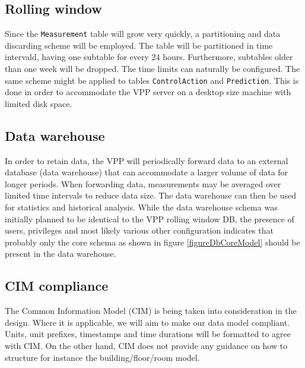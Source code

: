 \newpage


\subsection{Rolling window}\label{subsection:rollingwindow}
Since the \texttt{Measurement} table will grow very quickly, a partitioning and data discarding scheme will be employed. The table will be partitioned in time intervald, having one subtable for every 24 hours. Furthermore, subtables older than one week will be dropped. The time limits can naturally be configured. The same scheme might be applied to tables \texttt{ControlAction} and \texttt{Prediction}.
This is done in order to accommodate the VPP server on a desktop size machine with limited disk space.

\subsection{Data warehouse}
In order to retain data, the VPP will periodically forward data to an external database (data warehouse) that can accommodate a larger volume of data for longer periods. When forwarding data, measurements may be averaged over limited time intervals to reduce data size. The data warehouse can then be used for statistics and historical analysis. While the data warehouse schema was initially planned to be identical to the VPP rolling window DB, the presence of users, privileges and most likely various other configuration indicates that probably only the core schema as shown in figure \ref{figureDbCoreModel} should be present in the data warehouse. 

\subsection{CIM compliance}
The Common Information Model (CIM) is being taken into consideration in the design. Where it is applicable, we will aim to make our data model compliant. Units, unit prefixes, timestamps and time durations will be formatted to agree with CIM. On the other hand, CIM does not provide any guidance on how to structure for instance the building/floor/room model.

